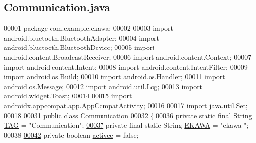 \hypertarget{_communication_8java_source}{}\subsection{Communication.\+java}
\label{_communication_8java_source}

\begin{DoxyCode}
00001 \textcolor{keyword}{package }com.example.ekawa;
00002 
00003 \textcolor{keyword}{import} android.bluetooth.BluetoothAdapter;
00004 \textcolor{keyword}{import} android.bluetooth.BluetoothDevice;
00005 \textcolor{keyword}{import} android.content.BroadcastReceiver;
00006 \textcolor{keyword}{import} android.content.Context;
00007 \textcolor{keyword}{import} android.content.Intent;
00008 \textcolor{keyword}{import} android.content.IntentFilter;
00009 \textcolor{keyword}{import} android.os.Build;
00010 \textcolor{keyword}{import} android.os.Handler;
00011 \textcolor{keyword}{import} android.os.Message;
00012 \textcolor{keyword}{import} android.util.Log;
00013 \textcolor{keyword}{import} android.widget.Toast;
00014 
00015 \textcolor{keyword}{import} androidx.appcompat.app.AppCompatActivity;
00016 
00017 \textcolor{keyword}{import} java.util.Set;
00018 
\hyperlink{classcom_1_1example_1_1ekawa_1_1_communication}{00031} \textcolor{keyword}{public} \textcolor{keyword}{class }\hyperlink{classcom_1_1example_1_1ekawa_1_1_communication}{Communication}
00032 \{
\hyperlink{classcom_1_1example_1_1ekawa_1_1_communication_af355bac38153a4e6d1cda0b3e74bc1c7}{00036}     \textcolor{keyword}{private} \textcolor{keyword}{static} \textcolor{keyword}{final} String \hyperlink{classcom_1_1example_1_1ekawa_1_1_communication_af355bac38153a4e6d1cda0b3e74bc1c7}{TAG} = \textcolor{stringliteral}{"Communication"}; 
\hyperlink{classcom_1_1example_1_1ekawa_1_1_communication_a85da929bac3fd83864a79ed4c3a57044}{00037}     \textcolor{keyword}{private} \textcolor{keyword}{final} \textcolor{keyword}{static} String \hyperlink{classcom_1_1example_1_1ekawa_1_1_communication_a85da929bac3fd83864a79ed4c3a57044}{EKAWA} = \textcolor{stringliteral}{"ekawa-"}; 
00038 
\hyperlink{classcom_1_1example_1_1ekawa_1_1_communication_a2f49177a9865ed41a759bce83658bb6e}{00042}     \textcolor{keyword}{private} \textcolor{keywordtype}{boolean} \hyperlink{classcom_1_1example_1_1ekawa_1_1_communication_a2f49177a9865ed41a759bce83658bb6e}{activee} = \textcolor{keyword}{false}; 

\end{DoxyCode}
